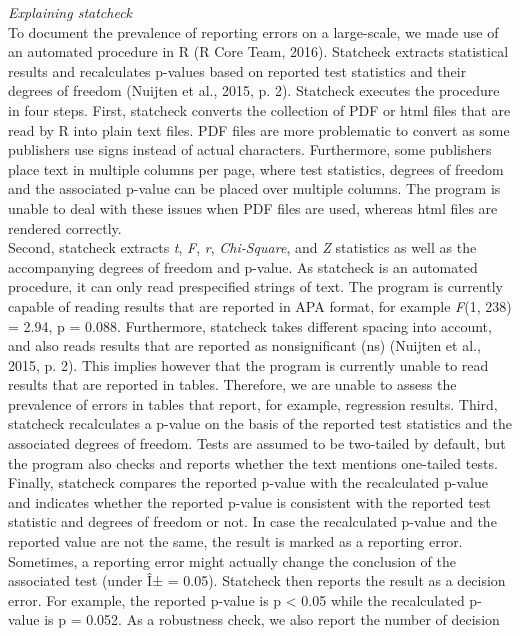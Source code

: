 \documentclass[english,man]{apa6}
\begin{document}
\emph{Explaining statcheck}\\To document the prevalence of reporting
errors on a large-scale, we made use of an automated procedure in R (R
Core Team, 2016). Statcheck extracts statistical results and
recalculates p-values based on reported test statistics and their
degrees of freedom (Nuijten et al., 2015, p. 2). Statcheck executes the
procedure in four steps. First, statcheck converts the collection of PDF
or html files that are read by R into plain text files. PDF files are
more problematic to convert as some publishers use signs instead of
actual characters. Furthermore, some publishers place text in multiple
columns per page, where test statistics, degrees of freedom and the
associated p-value can be placed over multiple columns. The program is
unable to deal with these issues when PDF files are used, whereas html
files are rendered correctly.\\Second, statcheck extracts \emph{t},
\emph{F}, \emph{r}, \emph{Chi-Square}, and \emph{Z} statistics as well
as the accompanying degrees of freedom and p-value. As statcheck is an
automated procedure, it can only read prespecified strings of text. The
program is currently capable of reading results that are reported in APA
format, for example \emph{F}(1, 238) = 2.94, p = 0.088. Furthermore,
statcheck takes different spacing into account, and also reads results
that are reported as nonsignificant (ns) (Nuijten et al., 2015, p. 2).
This implies however that the program is currently unable to read
results that are reported in tables. Therefore, we are unable to assess
the prevalence of errors in tables that report, for example, regression
results. Third, statcheck recalculates a p-value on the basis of the
reported test statistics and the associated degrees of freedom. Tests
are assumed to be two-tailed by default, but the program also checks and
reports whether the text mentions one-tailed tests.\\Finally, statcheck
compares the reported p-value with the recalculated p-value and
indicates whether the reported p-value is consistent with the reported
test statistic and degrees of freedom or not. In case the recalculated
p-value and the reported value are not the same, the result is marked as
a reporting error. Sometimes, a reporting error might actually change
the conclusion of the associated test (under Î± = 0.05). Statcheck then
reports the result as a decision error. For example, the reported
p-value is p \textless{} 0.05 while the recalculated p-value is p =
0.052. As a robustness check, we also report the number of decision
\end{document}
